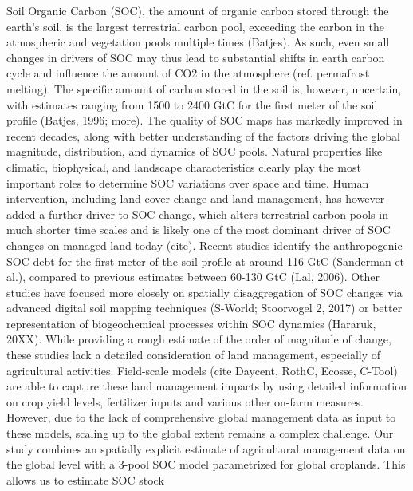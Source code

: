 \documentclass[gc, manuscript]{copernicus}
\begin{document}


\newpage

\introduction

Soil Organic Carbon (SOC), the amount of organic carbon stored through
the earth's soil, is the largest terrestrial carbon pool, exceeding the
carbon in the atmospheric and vegetation pools multiple times (Batjes).
As such, even small changes in drivers of SOC may thus lead to
substantial shifts in earth carbon cycle and influence the amount of CO2
in the atmosphere (ref. permafrost melting). The specific amount of
carbon stored in the soil is, however, uncertain, with estimates ranging
from 1500 to 2400 GtC for the first meter of the soil profile (Batjes,
1996; more). The quality of SOC maps has markedly improved in recent
decades, along with better understanding of the factors driving the
global magnitude, distribution, and dynamics of SOC pools. Natural
properties like climatic, biophysical, and landscape characteristics
clearly play the most important roles to determine SOC variations over
space and time. Human intervention, including land cover change and land
management, has however added a further driver to SOC change, which
alters terrestrial carbon pools in much shorter time scales and is
likely one of the most dominant driver of SOC changes on managed land
today (cite). Recent studies identify the anthropogenic SOC debt for the
first meter of the soil profile at around 116 GtC (Sanderman et al.),
compared to previous estimates between 60-130 GtC (Lal, 2006). Other
studies have focused more closely on spatially disaggregation of SOC
changes via advanced digital soil mapping techniques (S-World;
Stoorvogel 2, 2017) or better representation of biogeochemical processes
within SOC dynamics (Hararuk, 20XX). While providing a rough estimate of
the order of magnitude of change, these studies lack a detailed
consideration of land management, especially of agricultural activities.
Field-scale models (cite Daycent, RothC, Ecosse, C-Tool) are able to
capture these land management impacts by using detailed information on
crop yield levels, fertilizer inputs and various other on-farm measures.
However, due to the lack of comprehensive global management data as
input to these models, scaling up to the global extent remains a complex
challenge. Our study combines an spatially explicit estimate of
agricultural management data on the global level with a 3-pool SOC model
parametrized for global croplands. This allows us to estimate SOC stock
\end{document}
